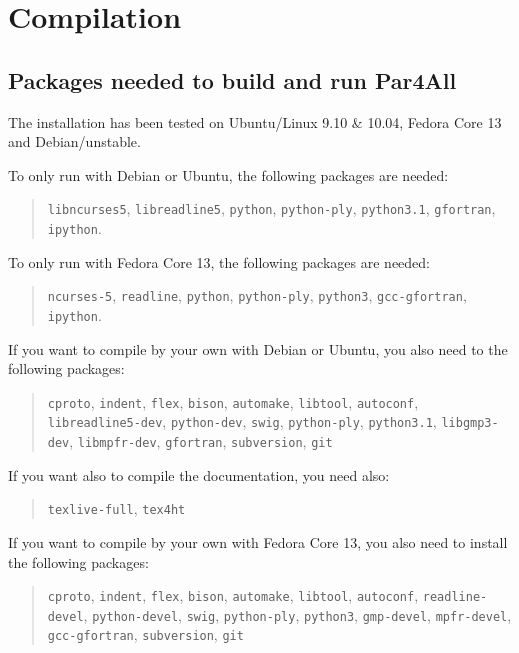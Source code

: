 \documentclass[a4paper]{article}
\begin{document}



\section{Compilation}
\label{sec:compilation}

\subsection{Packages needed to build and run Par4All}
\label{sec:pack-need-build}

The installation has been tested on Ubuntu/Linux 9.10 \& 10.04,
Fedora Core 13 and Debian/unstable.

To only run \Apfa with Debian or Ubuntu, the following packages are needed:
\begin{quote}
  \texttt{libncurses5}, \texttt{libreadline5}, \texttt{python},
  \texttt{python-ply}, \texttt{python3.1}, \texttt{gfortran},
  \texttt{ipython}.
\end{quote}

To only run \Apfa with Fedora Core 13, the following packages are needed:
\begin{quote}
  \texttt{ncurses-5}, \texttt{readline}, \texttt{python},
  \texttt{python-ply}, \texttt{python3}, \texttt{gcc-gfortran},
  \texttt{ipython}.
\end{quote}


If you want to compile \Apfa by your own with Debian or Ubuntu, you also
need to the following packages:
\begin{quote}
  \texttt{cproto}, \texttt{indent}, \texttt{flex}, \texttt{bison},
  \texttt{automake}, \texttt{libtool}, \texttt{autoconf},
  \texttt{libreadline5-dev}, \texttt{python-dev}, \texttt{swig},
  \texttt{python-ply}, \texttt{python3.1}, \texttt{libgmp3-dev},
  \texttt{libmpfr-dev}, \texttt{gfortran}, \texttt{subversion},
  \texttt{git}
\end{quote}

If you want also to compile the documentation, you need also:
\begin{quote}
  \texttt{texlive-full}, \texttt{tex4ht}
\end{quote}

If you want to compile \Apfa by your own with Fedora Core 13, you also
need to install the following packages:
\begin{quote}
  \texttt{cproto}, \texttt{indent}, \texttt{flex}, \texttt{bison},
  \texttt{automake}, \texttt{libtool}, \texttt{autoconf},
  \texttt{readline-devel}, \texttt{python-devel}, \texttt{swig},
  \texttt{python-ply}, \texttt{python3}, \texttt{gmp-devel},
  \texttt{mpfr-devel}, \texttt{gcc-gfortran}, \texttt{subversion},
  \texttt{git}
\end{quote}
\end{document}

